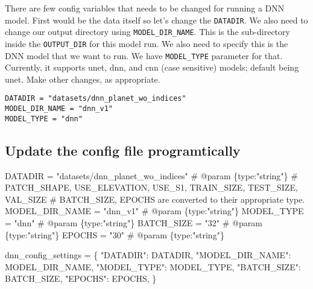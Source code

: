 \documentclass[
  letterpaper,
  DIV=11,
  numbers=noendperiod]{scrreprt}
\newenvironment{Shaded}{\begin{snugshade}}{\end{snugshade}}
\newcommand{\CommentTok}[1]{\textcolor[rgb]{0.37,0.37,0.37}{#1}}
\newcommand{\NormalTok}[1]{\textcolor[rgb]{0.00,0.23,0.31}{#1}}
\newcommand{\OperatorTok}[1]{\textcolor[rgb]{0.37,0.37,0.37}{#1}}
\newcommand{\StringTok}[1]{\textcolor[rgb]{0.13,0.47,0.30}{#1}}
\begin{document}
There are few config variables that needs to be changed for running a
DNN model. First would be the data itself so let's change the
\texttt{DATADIR}. We also need to change our output directory using
\texttt{MODEL\_DIR\_NAME}. This is the sub-directory inside the
\texttt{OUTPUT\_DIR} for this model run. We also need to specify this is
the DNN model that we want to run. We have \texttt{MODEL\_TYPE}
parameter for that. Currently, it supports unet, dnn, and cnn (case
sensitive) models; default being unet. Make other changes, as
appropriate.

\begin{verbatim}
DATADIR = "datasets/dnn_planet_wo_indices"
MODEL_DIR_NAME = "dnn_v1"
MODEL_TYPE = "dnn"
\end{verbatim}

\subsection{Update the config file
programtically}\label{update-the-config-file-programtically-1}

\begin{Shaded}
\begin{Highlighting}[]
\NormalTok{DATADIR }\OperatorTok{=} \StringTok{"datasets/dnn\_planet\_wo\_indices"} \CommentTok{\# @param \{type:"string"\}}
\CommentTok{\# PATCH\_SHAPE, USE\_ELEVATION, USE\_S1, TRAIN\_SIZE, TEST\_SIZE, VAL\_SIZE}
\CommentTok{\# BATCH\_SIZE, EPOCHS are converted to their appropriate type.}
\NormalTok{MODEL\_DIR\_NAME }\OperatorTok{=} \StringTok{"dnn\_v1"} \CommentTok{\# @param \{type:"string"\}}
\NormalTok{MODEL\_TYPE }\OperatorTok{=} \StringTok{"dnn"} \CommentTok{\# @param \{type:"string"\}}
\NormalTok{BATCH\_SIZE }\OperatorTok{=} \StringTok{"32"} \CommentTok{\# @param \{type:"string"\}}
\NormalTok{EPOCHS }\OperatorTok{=} \StringTok{"30"} \CommentTok{\# @param \{type:"string"\}}
\end{Highlighting}
\end{Shaded}

\begin{Shaded}
\begin{Highlighting}[]
\NormalTok{dnn\_config\_settings }\OperatorTok{=}\NormalTok{ \{}
    \StringTok{"DATADIR"}\NormalTok{: DATADIR,}
    \StringTok{"MODEL\_DIR\_NAME"}\NormalTok{: MODEL\_DIR\_NAME,}
    \StringTok{"MODEL\_TYPE"}\NormalTok{: MODEL\_TYPE,}
    \StringTok{"BATCH\_SIZE"}\NormalTok{: BATCH\_SIZE,}
    \StringTok{"EPOCHS"}\NormalTok{: EPOCHS,}
\NormalTok{\}}
\end{Highlighting}
\end{Shaded}
\end{document}
